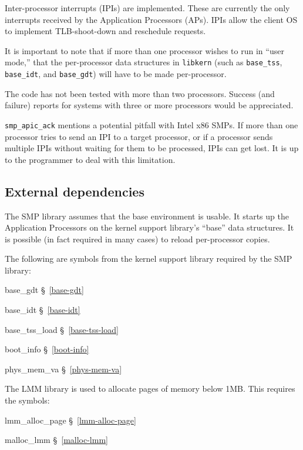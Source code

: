 Inter-processor interrupts (IPIs) are implemented.  These are currently the
only interrupts received by the Application Processors (APs).  IPIs
allow the client OS to implement TLB-shoot-down and reschedule
requests.

It is important to note that if more than one processor wishes
to run in ``user mode,'' that the per-processor data structures
in {\tt libkern} (such as {\tt base_tss}, {\tt base_idt}, and {\tt base_gdt})
will have to be made per-processor.

The \oskit{} code has not been tested with more than two processors.
Success (and failure) reports for systems with three or more processors
would be appreciated.

{\tt smp_apic_ack} mentions a potential pitfall with Intel x86 SMPs.
If more than one processor tries to send an IPI to a target processor,
or if a processor sends multiple IPIs without waiting for them to
be processed, IPIs can get lost.  It is up to the programmer to
deal with this limitation.

\subsection{External dependencies}

The SMP library assumes that the base environment is usable.
It starts up the Application Processors on the kernel support library's
``base'' data structures.  It is possible (in fact required in many cases)
to reload per-processor copies.

The following are symbols from the kernel support library required by
the SMP library:
\begin{apidep}
	\item[base_gdt]		\S~\ref{base-gdt}
	\item[base_idt]		\S~\ref{base-idt}
	\item[base_tss_load]	\S~\ref{base-tss-load}
	\item[boot_info]	\S~\ref{boot-info}
	\item[phys_mem_va]	\S~\ref{phys-mem-va}
\end{apidep}

The LMM library is used to allocate pages of memory below 1MB\@.
This requires the symbols:
\begin{apidep}
	\item[lmm_alloc_page]	\S~\ref{lmm-alloc-page}
	\item[malloc_lmm]	\S~\ref{malloc-lmm}
\end{apidep}

